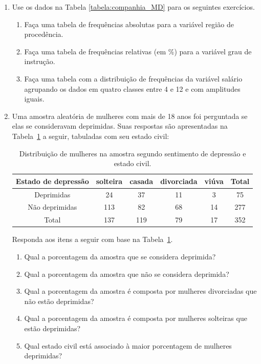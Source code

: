 \documentclass{article}
\begin{document}
\begin{enumerate}
	
	\item Use os dados na  Tabela \ref{tabela:companhia_MD} para os seguintes exercícios.
	\begin{enumerate}
		\item Faça uma tabela de frequências absolutas para a variável região de procedência.
		\item Faça uma tabela de frequências relativas (em \%) para a variável grau de instrução.
		\item Faça uma tabela com a distribuição de frequências da variável salário agrupando os dados em quatro classes entre 4 e 12 e com amplitudes iguais.
	\end{enumerate}		 
	
	

	\item Uma amostra aleatória de mulheres com mais de 18 anos foi perguntada se elas se consideravam deprimidas. Suas respostas são apresentadas na Tabela~\ref{t:depressao_mulheres} a seguir, tabuladas com seu estado civil:
	\begin{table}[htp]
	\centering
	\caption{Distribuição de mulheres na amostra segundo sentimento de depressão e estado civil. }
	\label{t:depressao_mulheres}
	\begin{tabular}{c|cccc|c}
	\hline
	Estado de depressão & solteira & casada & divorciada & viúva & Total \\
	\hline
Deprimidas & 24 & 37 & 11 & 3 & 75 \\
Não deprimidas & 113 & 82 & 68 & 14 & 277 \\
\hline
Total & 137 & 119 & 79 & 17 & 352 \\
	\hline
	\end{tabular}
	\end{table}
	
	Responda aos itens a seguir com base na Tabela~\ref{t:depressao_mulheres}.
	\begin{enumerate}
		\item Qual a porcentagem da amostra que se considera deprimida?
		\item Qual a porcentagem da amostra que não se considera deprimida?
		\item Qual a porcentagem da amostra é composta por mulheres divorciadas que não estão deprimidas?
		\item Qual a porcentagem da amostra é composta por mulheres solteiras que estão deprimidas?
		\item Qual estado civil está associado à maior porcentagem de mulheres deprimidas?
	\end{enumerate}
	


\end{enumerate}
\end{document}
